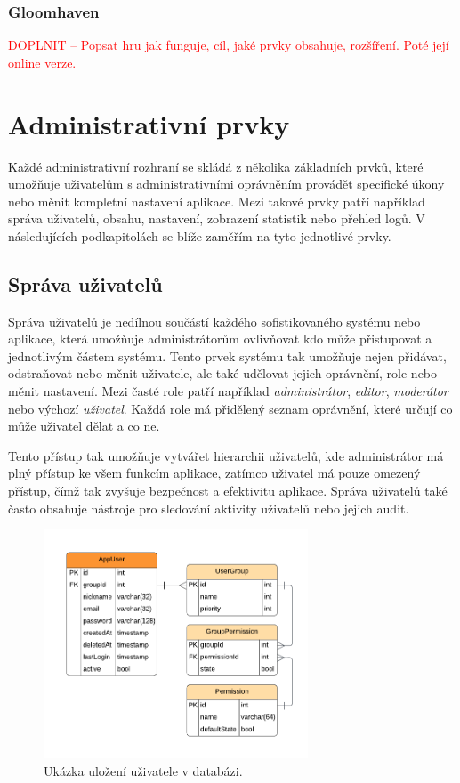 \subsubsection{Gloomhaven}
\label{subsubsec:popular-board-games-analysis-gloomhaven}
\textcolor{red}{DOPLNIT -- Popsat hru jak funguje, cíl, jaké prvky obsahuje, rozšíření. Poté její online verze.}

\section{Administrativní prvky}
\label{sec:admin-elements}
Každé administrativní rozhraní se skládá z několika základních prvků, které umožňuje uživatelům s administrativními oprávněním provádět specifické úkony nebo měnit kompletní nastavení aplikace. Mezi takové prvky patří například správa uživatelů, obsahu, nastavení, zobrazení statistik nebo přehled logů. V následujících podkapitolách se blíže zaměřím na tyto jednotlivé prvky.

\subsection{Správa uživatelů}
\label{subsec:admin-elements-user-management}
Správa uživatelů je nedílnou součástí každého sofistikovaného systému nebo aplikace, která umožňuje administrátorům ovlivňovat kdo může přistupovat a jednotlivým částem systému. Tento prvek systému tak umožňuje nejen přidávat, odstraňovat nebo měnit uživatele, ale také udělovat jejich oprávnění, role nebo měnit nastavení. Mezi časté role patří například \textit{administrátor}, \textit{editor}, \textit{moderátor} nebo výchozí \textit{uživatel}. Každá role má přidělený seznam oprávnění, které určují co může uživatel dělat a co ne.

Tento přístup tak umožňuje vytvářet hierarchii uživatelů, kde administrátor má plný přístup ke všem funkcím aplikace, zatímco uživatel má pouze omezený přístup, čímž tak zvyšuje bezpečnost a efektivitu aplikace. Správa uživatelů také často obsahuje nástroje pro sledování aktivity uživatelů nebo jejich audit.

\begin{figure}[H]
    \centering
    \includegraphics[width=0.7\textwidth]{diagrams/userManagement}
    \caption{Ukázka uložení uživatele v databázi. \cite{responsive_design}}
    \label{fig:user-management}
\end{figure}

